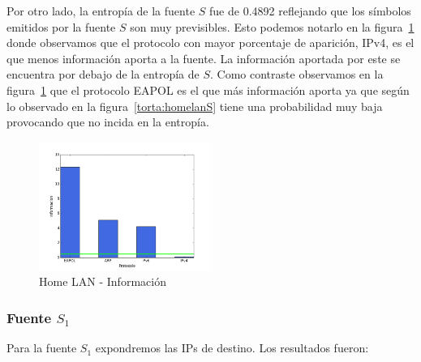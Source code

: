 \documentclass[final,inline,narroweqnarray,a4paper]{ieee}
\begin{document}
Por otro lado, la entropía de la fuente $S$ fue de 0.4892 reflejando que los símbolos emitidos por la fuente $S$ son muy previsibles. Esto podemos notarlo en la figura~\ref{histo:homelanS} donde observamos que el protocolo con mayor porcentaje de aparición, IPv4,  es el que menos información aporta a la fuente. La información aportada por este se encuentra por debajo de la entropía de $S$. Como contraste observamos en la figura~\ref{histo:homelanS} que el protocolo EAPOL es el que más información aporta ya que según lo observado en la figura~\ref{torta:homelanS} tiene una probabilidad muy baja provocando que no incida en la entropía.

\begin{figure}[H]
    \begin{center}
        \includegraphics[width=0.5\textwidth]{plot/homelanS-bar.png}
        \caption{Home LAN - Información}
        \label{histo:homelanS}
    \end{center}
\end{figure}

\subsubsection{Fuente $S_1$}
Para la fuente $S_1$ expondremos las IPs de destino. Los resultados fueron:
\end{document}
